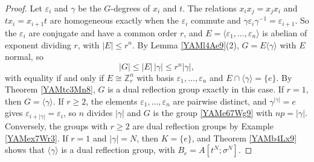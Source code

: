 \documentclass[reqno]{amsart}
\numberwithin{equation}{section}
\theoremstyle{definition}
\theoremstyle{remark}
\theoremstyle{plain}
\begin{document}
\begin{proof}
Let $\varepsilon_i$ and $\gamma$ be the $G$-degrees of $x_i$ and $t$. The relations $x_ix_j=x_jx_i$ and $tx_i=x_{i+1}t$ are homogeneous exactly when the $\varepsilon_i$ commute and $\gamma\varepsilon_i\gamma^{-1}=\varepsilon_{i+1}$. So the $\varepsilon_i$ are conjugate and have a common order $r$, and $E=\langle\varepsilon_1,\dots,\varepsilon_n\rangle$ is abelian of exponent dividing $r$, with $|E|\le r^n$. By Lemma \ref{YAMl4Ae9}(2), $G=E\langle\gamma\rangle$ with $E$ normal, so
\[
|G|\le|E|\,|\gamma|\le r^n|\gamma|,
\]
with equality if and only if $E\cong\mathbb Z_r^n$ with basis $\varepsilon_1,\dots,\varepsilon_n$ and $E\cap\langle\gamma\rangle=\{e\}$. By Theorem \ref{YAMtc3Mn8}, $G$ is a dual reflection group exactly in this case. If $r=1$, then $G=\langle\gamma\rangle$. If $r\ge2$, the elements $\varepsilon_1,\dots,\varepsilon_n$ are pairwise distinct, and $\gamma^{|\gamma|}=e$ gives $\varepsilon_{i+|\gamma|}=\varepsilon_i$, so $n$ divides $|\gamma|$ and $G$ is the group \eqref{YAMe67Wg9} with $np=|\gamma|$. Conversely, the groups with $r\ge2$ are dual reflection groups by Example \ref{YAMex7Wr3}. If $r=1$ and $|\gamma|=N$, then $K=\{e\}$, and Theorem \ref{YAMb4Lx9} shows that $\langle\gamma\rangle$ is a dual reflection group, with $B_e=A[t^N;\sigma^N]$.
\end{proof}
\end{document}
